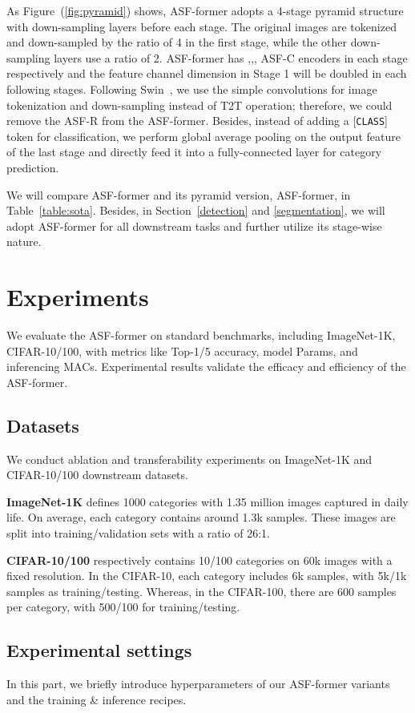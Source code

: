 \documentclass[lettersize,journal]{IEEEtran}
\begin{document}
As Figure~(\ref{fig:pyramid}) shows, ASF-former adopts a 4-stage pyramid structure with down-sampling layers before each stage. The original images are tokenized and down-sampled by the ratio of 4 in the first stage, while the other down-sampling layers use a ratio of 2. ASF-former has ,,, ASF-C encoders in each stage respectively and the feature channel dimension  in Stage 1 will be doubled in each following stages. Following Swin~\cite{liu2021Swin}, we use the simple convolutions for image tokenization and down-sampling instead of T2T operation; therefore, we could remove the ASF-R from the ASF-former. Besides, instead of adding a [{\tt CLASS}] token for classification, we perform global average pooling on the output feature of the last stage and directly feed it into a fully-connected layer for category prediction.

We will compare ASF-former and its pyramid version, ASF-former, in Table~\ref{table:sota}. Besides, in Section~\ref{detection} and \ref{segmentation}, we will adopt ASF-former for all downstream tasks and further utilize its stage-wise nature.

\section{Experiments}
We evaluate the ASF-former on standard benchmarks, including ImageNet-1K, CIFAR-10/100, with metrics like Top-1/5 accuracy, model Params, and inferencing MACs. Experimental results validate the efficacy and efficiency of the ASF-former.
\subsection{Datasets}
We conduct ablation and transferability experiments on ImageNet-1K and CIFAR-10/100 downstream datasets.

\textbf{ImageNet-1K} \cite{imagenet_cvpr09} defines 1000 categories with 1.35 million images captured in daily life. On average, each category contains around 1.3k samples. These images are split into training/validation sets with a ratio of 26:1.

\textbf{CIFAR-10/100} \cite{krizhevsky2009learning} respectively contains 10/100 categories on 60k images with a fixed  resolution. In the CIFAR-10, each category includes 6k samples, with 5k/1k samples as training/testing. Whereas, in the CIFAR-100, there are 600 samples per category, with 500/100 for training/testing.

\subsection{Experimental settings}
In this part, we briefly introduce hyperparameters of our ASF-former variants and the training \& inference recipes.
\end{document}
